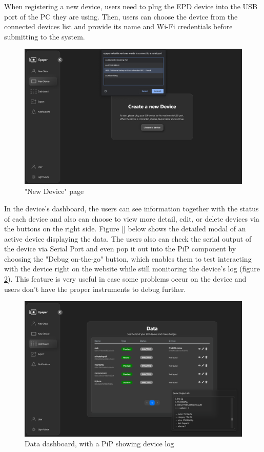 \documentclass[../Main.tex]{subfiles}
\begin{document}
When registering a new device, users need to plug the EPD device into the USB port of the PC they are using. Then, users can choose the device from the connected devices list and provide its name and Wi-Fi credentials before submitting to the system.

\begin{figure}[H]
    \centering
    \includegraphics[width=0.87\linewidth]{doc//imgs/ui_new-device.png}
    \caption{"New Device" page}
    \label{fig:ui_new-device}
\end{figure}
In the device's dashboard, the users can see information together with the status of each device and also can choose to view more detail, edit, or delete devices via the buttons on the right side. Figure \ref{} below shows the detailed modal of an active device displaying the data. The users also can check the serial output of the device via Serial Port and even pop it out into the PiP component by choosing the "Debug on-the-go" button, which enables them to test interacting with the device right on the website while still monitoring the device's log (figure \ref{fig:data-dashboard}). This feature is very useful in case some problems occur on the device and users don't have the proper instruments to debug further.

\begin{figure}[H]
        \centering
        \includegraphics[width=0.87\linewidth]{doc//imgs/ui_data-dashboard.png}
        \caption{Data dashboard, with a PiP showing device log}
        \label{fig:data-dashboard}
\end{figure}
\end{document}
